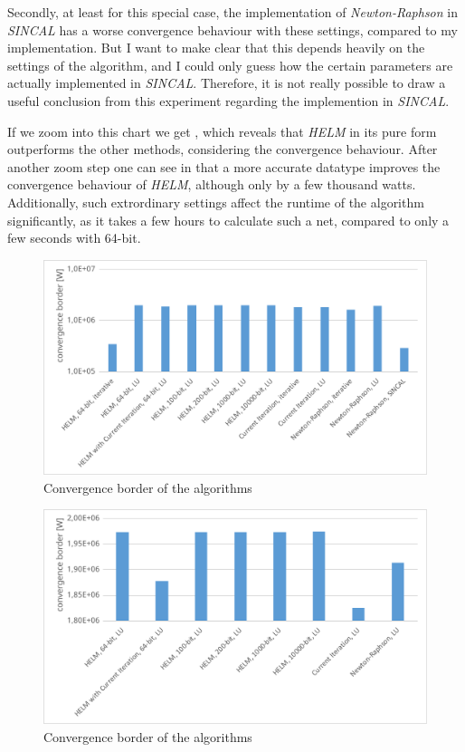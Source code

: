 Secondly, at least for this special case, the implementation of \emph{Newton-Raphson} in \emph{SINCAL} has a worse convergence behaviour with these settings, compared to my implementation. But I want to make clear that this depends heavily on the settings of the algorithm, and I could only guess how the certain parameters are actually implemented in \emph{SINCAL}. Therefore, it is not really possible to draw a useful conclusion from this experiment regarding the implemention in \emph{SINCAL}.

If we zoom into this chart we get , which reveals that \emph{HELM} in its pure form outperforms the other methods, considering the convergence behaviour. After another zoom step one can see in  that a more accurate datatype improves the convergence behaviour of \emph{HELM}, although only by a few thousand watts. Additionally, such extrordinary settings affect the runtime of the algorithm significantly, as it takes a few hours to calculate such a net, compared to only a few seconds with 64-bit.

\begin{figure}
	\centering
	\includegraphics[scale=0.7]{figures/convergence_border_vorstadtnetz_1}
	\caption[Comparison, convergence]{Convergence border of the algorithms}
	\label{fig:comparison_convergence_border_1}
\end{figure}

\begin{figure}
	\centering
	\includegraphics[scale=0.7]{figures/convergence_border_vorstadtnetz_2}
	\caption[Comparison, convergence]{Convergence border of the algorithms}
	\label{fig:comparison_convergence_border_2}
\end{figure}

